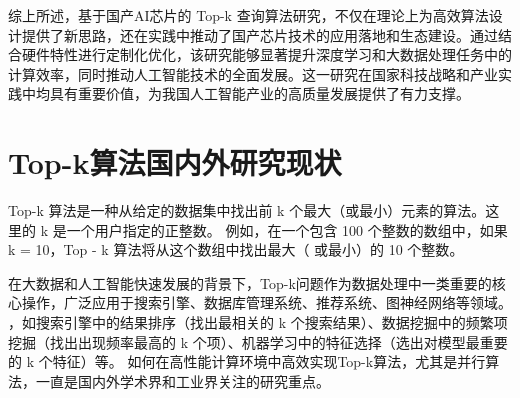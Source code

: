 综上所述，基于国产AI芯片的 Top-k 查询算法研究，不仅在理论上为高效算法设计提供了新思路，还在实践中推动了国产芯片技术的应用落地和生态建设。通过结合硬件特性进行定制化优化，该研究能够显著提升深度学习和大数据处理任务中的计算效率，同时推动人工智能技术的全面发展。这一研究在国家科技战略和产业实践中均具有重要价值，为我国人工智能产业的高质量发展提供了有力支撑。

\section{Top-k算法国内外研究现状}

Top-k 算法是一种从给定的数据集中找出前 k 个最大（或最小）元素的算法。这里的 k 是一个用户指定的正整数。
例如，在一个包含 100 个整数的数组中，如果 k = 10，Top - k 算法将从这个数组中找出最大（
或最小）的 10 个整数\cite{hoare1961algorithm}。

在大数据和人工智能快速发展的背景下，Top-k问题作为数据处理中一类重要的核心操作，广泛应用于搜索引擎、数据库管理系统、推荐系统、图神经网络等领域。
，如搜索引擎中的结果排序（找出最相关的 k 个搜索结果）、数据挖掘中的频繁项挖掘（找出出现频率最高的 k 个项）、机器学习中的特征选择（选出对模型最重要的 k 个特征）等。
如何在高性能计算环境中高效实现Top-k算法，尤其是并行算法，一直是国内外学术界和工业界关注的研究重点\cite{zhang2023parallel}\cite{Gaihre_Zheng_Weitze_Li_Song_Ding_Li_Liu_2021}。

